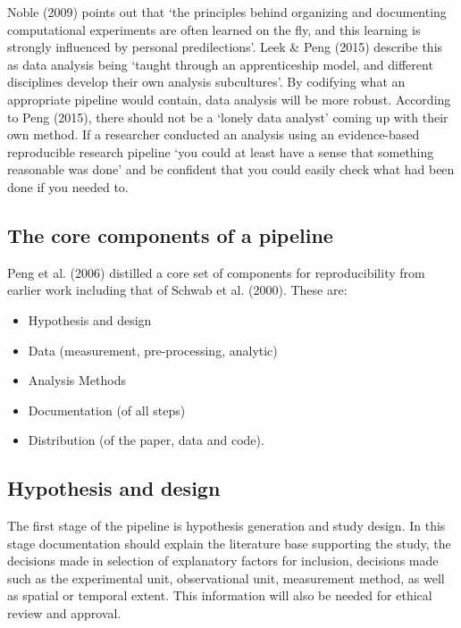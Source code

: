 \documentclass[11pt,a4paper]{article}
\begin{document}
Noble (2009) points out that `the principles behind organizing and
documenting computational experiments are often learned on the fly, and
this learning is strongly influenced by personal predilections'. Leek \&
Peng (2015) describe this as data analysis being `taught through an
apprenticeship model, and different disciplines develop their own
analysis subcultures'. By codifying what an appropriate pipeline would
contain, data analysis will be more robust. According to Peng (2015),
there should not be a `lonely data analyst' coming up with their own
method. If a researcher conducted an analysis using an evidence-based
reproducible research pipeline `you could at least have a sense that
something reasonable was done' and be confident that you could easily
check what had been done if you needed to.

\subsection{The core components of a
pipeline}\label{the-core-components-of-a-pipeline}

Peng et al. (2006) distilled a core set of components for
reproducibility from earlier work including that of Schwab et al.
(2000). These are:

\begin{itemize}
\itemsep1pt\parskip0pt
\item
  Hypothesis and design
\item
  Data (measurement, pre-processing, analytic)
\item
  Analysis Methods
\item
  Documentation (of all steps)
\item
  Distribution (of the paper, data and code).
\end{itemize}

\subsection{Hypothesis and design}\label{hypothesis-and-design}

The first stage of the pipeline is hypothesis generation and study
design. In this stage documentation should explain the literature base
supporting the study, the decisions made in selection of explanatory
factors for inclusion, decisions made such as the experimental unit,
observational unit, measurement method, as well as spatial or temporal
extent. This information will also be needed for ethical review and
approval.
\end{document}
